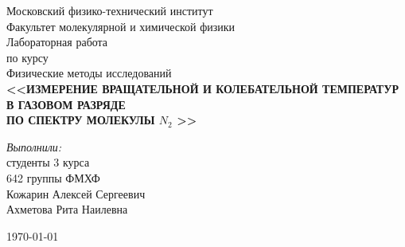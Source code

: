 \begin{titlepage}
\begin{center} 
 
\large Московский физико-технический институт\\
Факультет молекулярной и химической физики\\
\vspace{7cm}
\Large Лабораторная работа \\по курсу \\ Физические методы исследований\\
\textbf{\Huge <<ИЗМЕРЕНИЕ ВРАЩАТЕЛЬНОЙ И КОЛЕБАТЕЛЬНОЙ ТЕМПЕРАТУР\\ В
	ГАЗОВОМ РАЗРЯДЕ\\
	ПО СПЕКТРУ МОЛЕКУЛЫ $N_2$ >>}\\
\end{center} 

\vspace{5cm}
{\par 
	\raggedleft \large 
	\emph{Выполнили:}\\ 
	студенты 3 курса\\ 
	642 группы ФМХФ\\ 
	Кожарин Алексей Сергеевич \\ 
	Ахметова Рита Наилевна
\par}
\begin{center}
\vfill \today
\end{center}
\end{titlepage}
\newpage
\setcounter{page}{2}